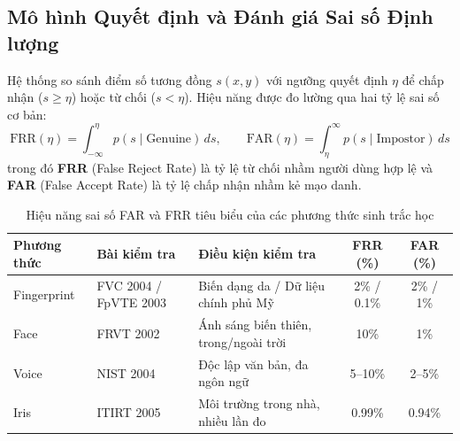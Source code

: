 \documentclass[11pt, a4paper]{article}
\begin{document}
\subsection{Mô hình Quyết định và Đánh giá Sai số Định lượng}
Hệ thống so sánh điểm số tương đồng $s(x, y)$ với ngưỡng quyết định $\eta$ để chấp nhận ($s \ge \eta$) hoặc từ chối ($s < \eta$). Hiệu năng được đo lường qua hai tỷ lệ sai số cơ bản:
\begin{equation}
    \text{FRR}(\eta) = \int_{-\infty}^\eta p(s \mid \text{Genuine}) \, ds, \qquad \text{FAR}(\eta) = \int_\eta^\infty p(s \mid \text{Impostor}) \, ds
\end{equation}
trong đó \textbf{FRR} (False Reject Rate) là tỷ lệ từ chối nhầm người dùng hợp lệ và \textbf{FAR} (False Accept Rate) là tỷ lệ chấp nhận nhầm kẻ mạo danh.

\begin{table}[ht]
\centering
\small
\caption{Hiệu năng sai số FAR và FRR tiêu biểu của các phương thức sinh trắc học}
\vspace{1mm}
\begin{tabular}{lllcc}
\toprule
\textbf{Phương thức} & \textbf{Bài kiểm tra} & \textbf{Điều kiện kiểm tra} & \textbf{FRR (\%)} & \textbf{FAR (\%)} \\
\midrule
Fingerprint & FVC 2004 / FpVTE 2003 & Biến dạng da / Dữ liệu chính phủ Mỹ & 2\% / 0.1\% & 2\% / 1\% \\
Face & FRVT 2002 & Ánh sáng biến thiên, trong/ngoài trời & 10\% & 1\% \\
Voice & NIST 2004 & Độc lập văn bản, đa ngôn ngữ & 5--10\% & 2--5\% \\
Iris & ITIRT 2005 & Môi trường trong nhà, nhiều lần đo & 0.99\% & 0.94\% \\
\bottomrule
\end{tabular}
\end{table}
\end{document}
